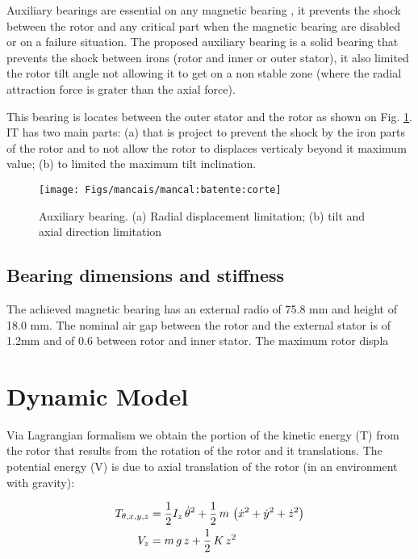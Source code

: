 \documentclass[journal,a4paper,oneside,twocolumn]{IEEEtran}
\begin{document}
Auxiliary bearings are essential on any magnetic bearing , it prevents the shock between the rotor and any critical part when the magnetic bearing are disabled or on a failure situation. The proposed auxiliary bearing is a solid bearing that prevents the shock between irons (rotor and inner or outer stator), it also limited the rotor tilt angle not allowing it to get on a non stable zone (where the radial attraction force is grater than the axial force). 

This bearing is locates between the outer stator and the rotor as shown on Fig. \ref{fig:mancal:batente:corte}. IT has two main parts: (a) that is project to prevent the shock by the iron parts of the rotor and to not allow the rotor to displaces verticaly beyond it maximum value; (b) to limited the maximum tilt inclination.

\begin{figure}[th!]
\centering
\texttt{[image: Figs/mancais/mancal:batente:corte]}
\caption{Auxiliary bearing. (a) Radial displacement limitation; (b) tilt and axial direction limitation}
\label{fig:mancal:batente:corte}
\end{figure}

\subsection{Bearing dimensions and stiffness}

The achieved magnetic bearing has an external radio of 75.8 mm and height of 18.0 mm. The nominal air gap between the rotor and the external stator is of 1.2mm and of 0.6 between rotor and inner stator. The maximum rotor displa


	

\section{Dynamic Model}

Via Lagrangian formalism we obtain the portion of the kinetic energy (T) from the rotor that results from the rotation of the rotor and it translations. The potential energy (V) is due to axial translation of the rotor (in an environment with gravity): 

 \begin{align}
 	T_{\theta, x, y, z} &= \frac{1}{2} I_z \, \dot{\theta}^2 + \frac{1}{2} \, m \, \left( \dot{x}^2 + \dot{y}^2 + \dot{z}^2 \right) \notag \\
 	V_z &= m \, g \, z + \frac{1}{2} \, K \, z^2
 \end{align}
 
\end{document}
